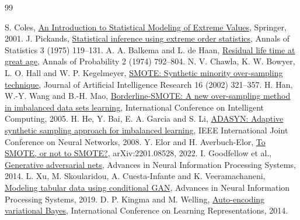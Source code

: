 \documentclass[12pt,a4paper]{report}
\newcommand{\reflink}[2]{\href{#1}{\textcolor{linkblue}{#2}}}
\begin{document}
\renewcommand{\bibname}{References:}
{
\begin{thebibliography}{99}
\setlength{\itemsep}{2pt}
\small
{} S. Coles, \reflink{https://doi.org/10.1007/978-1-4471-3675-0}{An Introduction to Statistical Modeling of Extreme Values}, Springer, 2001.
 J. Pickands, \reflink{https://doi.org/10.1214/aos/1176343003}{Statistical inference using extreme order statistics}, Annals of Statistics 3 (1975) 119--131.
 A. A. Balkema and L. de Haan, \reflink{https://doi.org/10.1214/aop/1176996548}{Residual life time at great age}, Annals of Probability 2 (1974) 792--804.
 N. V. Chawla, K. W. Bowyer, L. O. Hall and W. P. Kegelmeyer, \reflink{https://doi.org/10.1613/jair.953}{SMOTE: Synthetic minority over-sampling technique}, Journal of Artificial Intelligence Research 16 (2002) 321--357.
 H. Han, W.-Y. Wang and B.-H. Mao, \reflink{https://doi.org/10.1007/11538059_91}{Borderline-SMOTE: A new over-sampling method in imbalanced data sets learning}, International Conference on Intelligent Computing, 2005.
 H. He, Y. Bai, E. A. Garcia and S. Li, \reflink{https://doi.org/10.1109/IJCNN.2008.4633969}{ADASYN: Adaptive synthetic sampling approach for imbalanced learning}, IEEE International Joint Conference on Neural Networks, 2008.
 Y. Elor and H. Averbuch-Elor, \reflink{https://arxiv.org/abs/2201.08528}{To SMOTE, or not to SMOTE?}, arXiv:2201.08528, 2022.
 I. Goodfellow et al., \reflink{https://arxiv.org/abs/1406.2661}{Generative adversarial nets}, Advances in Neural Information Processing Systems, 2014.
 L. Xu, M. Skoularidou, A. Cuesta-Infante and K. Veeramachaneni, \reflink{https://arxiv.org/abs/1907.00503}{Modeling tabular data using conditional GAN}, Advances in Neural Information Processing Systems, 2019.
 D. P. Kingma and M. Welling, \reflink{https://arxiv.org/abs/1312.6114}{Auto-encoding variational Bayes}, International Conference on Learning Representations, 2014.

\end{thebibliography}}
\end{document}
